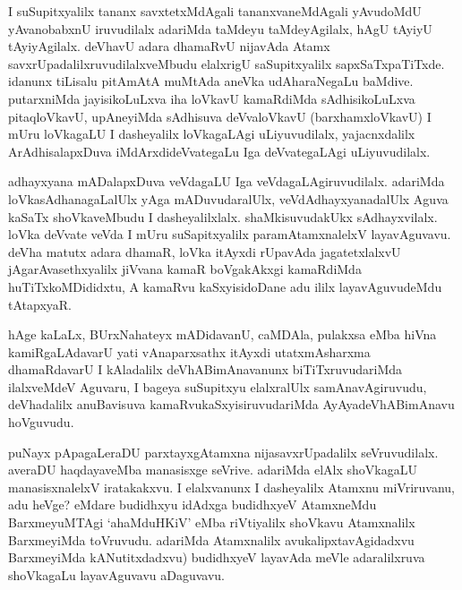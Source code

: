 
\begin{artha}
I suSupitxyalilx tananx savxtetxMdAgali tananxvaneMdAgali yAvudoMdU yAvanobabxnU iruvudilalx adariMda taMdeyu taMdeyAgilalx, hAgU tAyiyU tAyiyAgilalx. deVhavU adara dhamaRvU nijavAda Atamx savxrUpadalilxruvudilalxveMbudu elalxrigU saSupitxyalilx sapxSaTxpaTiTxde. idanunx tiLisalu pitAmAtA muMtAda aneVka udAharaNegaLu baMdive. putarxniMda jayisikoLuLxva iha loVkavU kamaRdiMda sAdhisikoLuLxva pitaqloVkavU, upAneyiMda sAdhisuva deVvaloVkavU (barxhamxloVkavU) I mUru loVkagaLU I dasheyalilx loVkagaLAgi uLiyuvudilalx, yajacnxdalilx ArAdhisalapxDuva iMdArxdideVvategaLu Iga deVvategaLAgi uLiyuvudilalx. 
\end{artha}

\begin{artha}%
adhayxyana mADalapxDuva veVdagaLU Iga veVdagaLAgiruvudilalx. adariMda loVkasAdhanagaLalUlx yAga mADuvudaralUlx, veVdAdhayxyanadalUlx Aguva kaSaTx shoVkaveMbudu I dasheyalilxlalx. shaMkisuvudakUkx sAdhayxvilalx. loVka deVvate veVda I mUru suSapitxyalilx paramAtamxnalelxV layavAguvavu. deVha matutx adara dhamaR, loVka itAyxdi rUpavAda jagatetxlalxvU jAgarAvasethxyalilx jiVvana kamaR boVgakAkxgi kamaRdiMda huTiTxkoMDididxtu, A kamaRvu kaSxyisidoDane adu ililx layavAguvudeMdu tAtapxyaR. 
\end{artha}


\begin{artha}
hAge kaLaLx, BUrxNahateyx mADidavanU, caMDAla, pulakxsa eMba hiVna kamiRgaLAdavarU yati vAnaparxsathx itAyxdi utatxmAsharxma dhamaRdavarU I kAladalilx deVhABimAnavanunx biTiTxruvudariMda ilalxveMdeV Aguvaru, I bageya suSupitxyu elalxralUlx samAnavAgiruvudu, deVhadalilx anuBavisuva kamaRvukaSxyisiruvudariMda AyAyadeVhABimAnavu hoVguvudu. 
\end{artha}


\begin{artha}
puNayx pApagaLeraDU parxtayxgAtamxna nijasavxrUpadalilx seVruvudilalx. averaDU haqdayaveMba manasisxge seVrive. adariMda elAlx shoVkagaLU manasisxnalelxV iratakakxvu. I elalxvanunx I dasheyalilx Atamxnu miVriruvanu, adu heVge? eMdare budidhxyu idAdxga budidhxyeV AtamxneMdu BarxmeyuMTAgi `ahaMduHKiV' eMba riVtiyalilx shoVkavu Atamxnalilx BarxmeyiMda toVruvudu. adariMda Atamxnalilx avukalipxtavAgidadxvu BarxmeyiMda kANutitxdadxvu) budidhxyeV layavAda meVle adaralilxruva shoVkagaLu layavAguvavu aDaguvavu. 
\end{artha}

